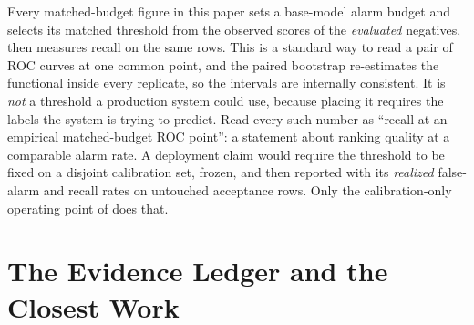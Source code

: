\documentclass[manuscript,screen,review,anonymous]{acmart}
\begin{document}
Every matched-budget figure in this paper sets a base-model alarm budget and selects its matched threshold
from the observed scores of the \emph{evaluated} negatives, then measures recall on the same rows. This is a standard way to read a
pair of ROC curves at one common point, and the paired bootstrap re-estimates the functional inside
every replicate, so the intervals are internally consistent. It is \emph{not} a threshold a production
system could use, because placing it requires the labels the system is trying to predict. Read every
such number as ``recall at an empirical matched-budget ROC point'': a statement about ranking quality
at a comparable alarm rate. A deployment claim would require the threshold to be fixed on a disjoint
calibration set, frozen, and then reported with its \emph{realized} false-alarm and recall rates on
untouched acceptance rows. Only the calibration-only operating point of  does that.

\section{The Evidence Ledger and the Closest Work}
\label{app:ledger}
\end{document}
